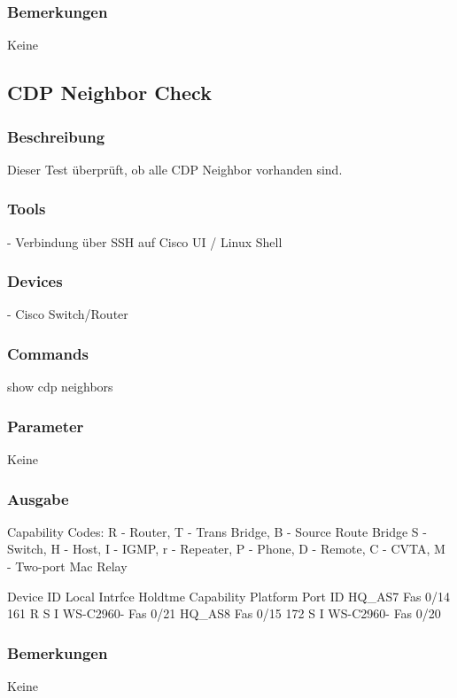 \documentclass[a4,12pt]{scrartcl}
\begin{document}
\subsubsection{Bemerkungen}
Keine



\subsection{CDP Neighbor Check}
\subsubsection{Beschreibung}
Dieser Test überprüft, ob alle CDP Neighbor vorhanden sind.
\subsubsection{Tools}
- Verbindung über SSH auf Cisco UI / Linux Shell
\subsubsection{Devices}
- Cisco Switch/Router
\subsubsection{Commands}
show cdp neighbors
\subsubsection{Parameter}
Keine
\subsubsection{Ausgabe}
Capability Codes: R - Router, T - Trans Bridge, B - Source Route Bridge\newline
                  S - Switch, H - Host, I - IGMP, r - Repeater, P - Phone,\newline
                  D - Remote, C - CVTA, M - Two-port Mac Relay\newline

Device ID        Local Intrfce     Holdtme    Capability  Platform  Port ID\newline
HQ_AS7           Fas 0/14          161             R S I  WS-C2960- Fas 0/21\newline
HQ_AS8           Fas 0/15          172              S I   WS-C2960- Fas 0/20\newline
\subsubsection{Bemerkungen}
Keine
\end{document}
